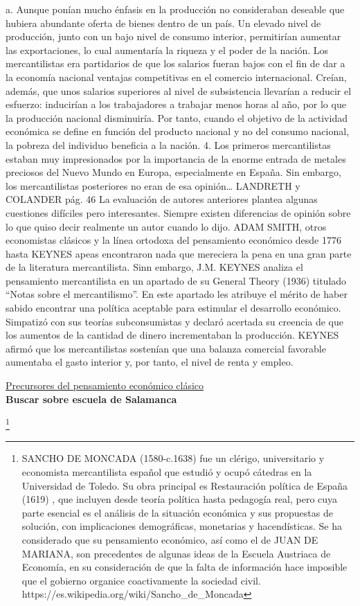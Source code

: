 \documentclass[10pt,a4paper]{article}
\begin{document}
a.
Aunque ponían mucho énfasis en la producción no consideraban deseable que hubiera abundante oferta de bienes dentro de un país. Un elevado nivel de producción, junto con un bajo nivel de consumo interior, permitirían aumentar las exportaciones, lo cual aumentaría la riqueza y el poder de la nación. Los mercantilistas era partidarios de que los salarios fueran bajos con el fin de dar a la economía nacional ventajas competitivas en el comercio internacional. Creían, además, que unos salarios superiores al nivel de subsistencia llevarían a reducir el esfuerzo: inducirían a los trabajadores a trabajar menos horas al año, por lo que la producción nacional disminuiría. Por tanto, cuando el objetivo de la actividad económica se define en función del producto nacional y no del consumo nacional, la pobreza del individuo beneficia a la nación.
4. Los primeros mercantilistas estaban muy impresionados por la importancia de la enorme entrada de metales preciosos del Nuevo Mundo en Europa, especialmente en España. Sin embargo, los mercantilistas posteriores no eran de esa opinión… LANDRETH y COLANDER pág. 46
La evaluación de autores anteriores plantea algunas cuestiones difíciles pero interesantes. Siempre existen diferencias de opinión sobre lo que quiso decir realmente un autor cuando lo dijo. ADAM SMITH, otros economistas clásicos y la línea ortodoxa del pensamiento económico desde 1776 hasta KEYNES apeas encontraron nada que mereciera la pena en una gran parte de la literatura mercantilista. Sinn embargo, J.M. KEYNES analiza el pensamiento mercantilista en un apartado de su General Theory (1936) titulado “Notas sobre el mercantilismo”. En este apartado les atribuye el mérito de haber sabido encontrar una política aceptable para estimular el desarrollo económico. Simpatizó con sus teorías subconsumistas y declaró acertada su creencia de que los aumentos de la cantidad de dinero incrementaban la producción. KEYNES afirmó que los mercantilistas sostenían que una balanza comercial favorable aumentaba el gasto interior y, por tanto, el nivel de renta y empleo.

\underline{Precursores del pensamiento económico clásico}\\
\textbf{Buscar sobre escuela de Salamanca}

\footnote{%
    SANCHO DE MONCADA (1580-c.1638) fue un clérigo, universitario y economista mercantilista español que estudió y ocupó cátedras en la Universidad de Toledo. Su obra principal es Restauración política de España (1619) , que incluyen desde teoría política hasta pedagogía real, pero cuya parte esencial es el análisis de la situación económica y sus propuestas de solución, con implicaciones demográficas, monetarias y hacendísticas. Se ha considerado que su pensamiento económico, así como el de JUAN DE MARIANA, son precedentes de algunas ideas de la Escuela Austriaca de Economía, en su consideración de que la falta de información hace imposible que el gobierno organice coactivamente la sociedad civil.
https://es.wikipedia.org/wiki/Sancho_de_Moncada
}
\end{document}
